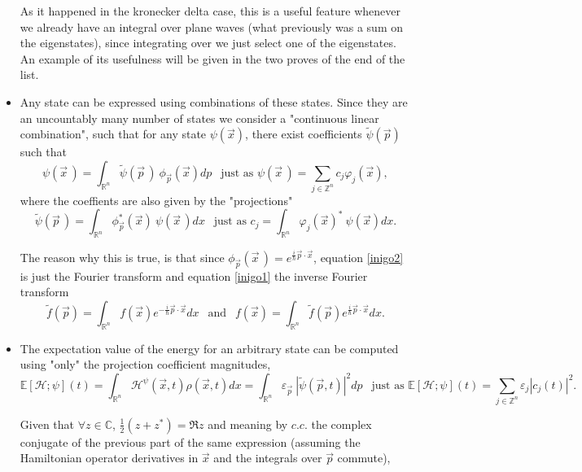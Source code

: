 \documentclass[11pt, a4paper]{article} %
\newcommand{\R}{\mathbb{R}} %
\newcommand{\Z}{\mathbb{Z}} %
\newcommand{\C}{\mathbb{C}}
\newcommand{\h}{\mathcal{H}}
\newcommand{\E}{\mathbb{E}}
\DeclareRobustCommand{\mybox}[2][gray!10]{%
\begin{tcolorbox}[   %
        left=0.2cm,
        right=0.2cm,
        top=0.15cm,
        bottom=0.15cm,
        colback=#1,
        colframe=#1,
        width=\dimexpr\textwidth\relax, 
        enlarge left by=0mm,
        boxsep=5pt,
        arc=0pt,outer arc=0pt,
        ]
        #2
\end{tcolorbox}
}
\begin{document}
\begin{itemize}
{As it happened in the kronecker delta case, this is a useful feature whenever we already have an integral over plane waves (what previously was a sum on the eigenstates), since integrating over we just select one of the eigenstates. An example of its usefulness will be given in the two proves of the end of the list. 

}
\item Any state can be expressed using combinations of these states. Since they are an uncountably many number of states we consider a "continuous linear combination", such that for any state $\psi(\vec{x})$, there exist coefficients $\tilde{\psi}(\vec{p})$ such that
\begin{equation}\label{inigo1}
\psi(\vec{x}\,)=\int_{\R^n}\tilde{\psi}(\vec{p}\,)\ \phi_{\vec{p}}(\vec{x})dp \ \ \text{ just as } \psi(\vec{x}\,)=\sum_{j\in\Z^n}c_j\varphi_{j}(\vec{x}),
\end{equation}
where the coeffients are also given by the "projections"
\begin{equation}\label{inigo2}
\tilde{\psi}(\vec{p}\,)=\int_{\R^n}\phi_{\vec{p}}^*(\vec{x})\ \psi(\vec{x}\,)dx\ \ \text{ just as } c_j=\int_{\R^n}\varphi_{j}(\vec{x})^*\ \psi(\vec{x})dx.
\end{equation}
\mybox{
The reason why this is true, is that since $\phi_{\vec{p}}(\vec{x}\,)=e^{\frac{i}{\hbar}\vec{p}\cdot\vec{x}}$, equation \eqref{inigo2} is just the Fourier transform and equation \eqref{inigo1} the inverse Fourier transform
\begin{equation}
\tilde{f}(\vec{p})=\int_{\R^n} f(\vec{x})e^{-\frac{i}{\hbar}\vec{p}\cdot\vec{x}} dx \ \ \text{ and }\ \ f(\vec{x})=\int_{\R^n} \tilde{f}(\vec{p})e^{\frac{i}{\hbar}\vec{p}\cdot\vec{x}} dx.
\end{equation}}
\item The expectation value of the energy for an arbitrary state can be computed using "only" the projection coefficient magnitudes,
\begin{equation}
\E[\h;\psi](t)=\int_{\R^n} \h^\psi(\vec{x},t)\rho(\vec{x},t)dx=\int_{\R^n}\varepsilon_{\vec{p}}\ |\tilde{\psi}(\vec{p},t)|^2dp \ \ \text{ just as }\E[\h;\psi](t)=\sum_{j\in\Z^n}\varepsilon_{j}|c_j(t)|^2.
\end{equation}
\mybox{
Given that $\forall z\in\C$, $\frac{1}{2}(z+z^*)=\Re{z}$ and meaning by $c.c.$ the complex conjugate of the previous part of the same expression (assuming the Hamiltonian operator derivatives in $\vec{x}$ and the integrals over $\vec{p}$ commute),
\begin{equation}

\end{equation}}
\end{itemize}
\end{document}
